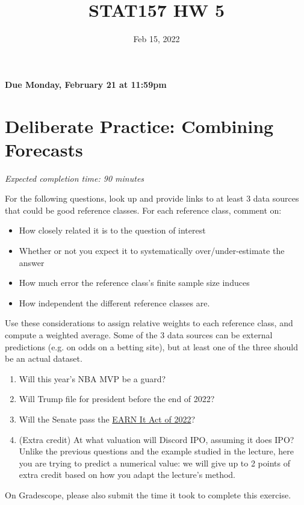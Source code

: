 \documentclass[11pt]{article}
\title{STAT157 HW 5}
\date{Feb 15, 2022}
\begin{document}
\maketitle

\hfill \textbf{Due Monday, February 21 at 11:59pm}

\section*{Deliberate Practice: Combining Forecasts}

\emph{Expected completion time: 90 minutes}


For the following questions, look up and provide links to at least 3 data sources that could be good reference classes. For each reference class, comment on: 
\begin{itemize}
	\item How closely related it is to the question of interest
	\item Whether or not you expect it to systematically over/under-estimate the answer
	\item How much error the reference class's finite sample size induces
	\item How independent the different reference classes are.
\end{itemize}

Use these considerations to assign relative weights to each reference class, and compute a weighted average. Some of the 3 data sources can be external predictions (e.g. on odds on a betting site), but at least one of the three should be an actual dataset.

\begin{enumerate}
	\item Will this year's NBA MVP be a guard?
	\item Will Trump file for president before the end of 2022?
	\item Will the Senate pass the \href{https://www.congress.gov/bill/117th-congress/senate-bill/3538}{EARN It Act of 2022}?
	\item (Extra credit) At what valuation will Discord IPO, assuming it does IPO? Unlike the previous questions and the example studied in the lecture, here you are trying to predict a numerical value: we will give up to 2 points of extra credit based on how you adapt the lecture's method.
\end{enumerate}

On Gradescope, please also submit the time it took to complete this exercise.
\end{document}
